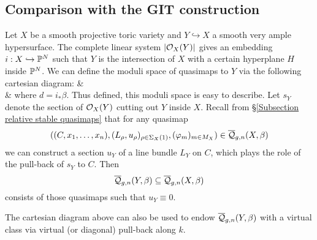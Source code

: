 \subsection{Comparison with the GIT construction} \label{Section comparison with GIT construction}

Let $X$ be a smooth projective toric variety and $Y \hookrightarrow X$ a smooth very ample hypersurface. The complete linear system $|\mathcal{O}_X(Y)|$ gives an embedding $i : X \hookrightarrow \mathbb P^N$ such that $Y$ is the intersection of $X$ with a certain hyperplane $H$ inside $\mathbb P^N$. We can define the moduli space of quasimaps to $Y$ via the following cartesian diagram:
\bcd
{}\ar[d]\ar[r] &  \ar[d,] \\
\ar[r,"k"] & 
\ecd
where $d=i_*\beta$. Thus defined, this moduli space is easy to describe. Let $s_Y$ denote the section of $\mathcal{O}_X(Y)$ cutting out $Y$ inside $X$. Recall from \S \ref{Subsection relative stable quasimaps} that for any quasimap
\begin{equation*} ((C,x_1,\ldots,x_n),(L_\rho,u_\rho)_{\rho \in \Sigma_X(1)}, (\varphi_m)_{m \in M_X}) \in \overline{\mathcal Q}_{g,n}(X,\beta) \end{equation*}
we can construct a section $u_Y$ of a line bundle $L_Y$ on $C$, which plays the role of the pull-back of $s_Y$ to $C$. Then
\begin{equation*} \overline{\mathcal Q}_{g,n}(Y,\beta) \subseteq \overline{\mathcal Q}_{g,n}(X,\beta) \end{equation*}
consists of those quasimaps such that $u_Y \equiv 0$.

The cartesian diagram above can also be used to endow $\overline{\mathcal Q}_{g,n}(Y,\beta)$ with a virtual class via virtual (or diagonal) pull-back along $k$.

